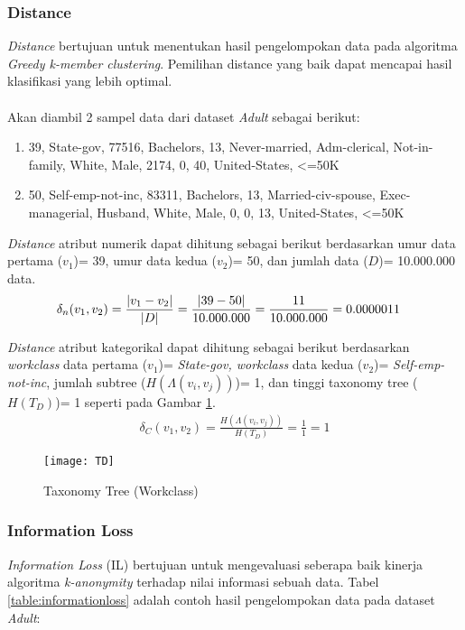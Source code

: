 \subsubsection{Distance}
\textit{Distance} bertujuan untuk menentukan hasil pengelompokan data pada algoritma \textit{Greedy k-member clustering}. Pemilihan distance yang baik dapat mencapai hasil klasifikasi yang lebih optimal.
\\\\
\noindent Akan diambil 2 sampel data dari dataset \textit{Adult} sebagai berikut:
\begin{enumerate}
\item 39, State-gov, 77516, Bachelors, 13, Never-married, Adm-clerical, Not-in-family, White, Male, 2174, 0, 40, United-States, <=50K
\item 50, Self-emp-not-inc, 83311, Bachelors, 13, Married-civ-spouse, Exec-managerial, Husband, White, Male, 0, 0, 13, United-States, <=50K
\end{enumerate}

\noindent \textit{Distance} atribut numerik dapat dihitung sebagai berikut berdasarkan umur data pertama ($v_1$)= 39, umur data kedua ($v_2$)= 50, dan jumlah data ($D$)= 10.000.000 data.
\begin{align*}
\delta_n(v_1,v_2) &= \frac{|v_1 - v_2|}{|D|}
= \frac{|39 - 50|}{10.000.000}\vspace{0.2cm}
= \frac{11}{10.000.000}\vspace{0.2cm}
= 0.0000011
\end{align*}

\noindent \textit{Distance} atribut kategorikal dapat dihitung sebagai berikut berdasarkan \textit{workclass} data pertama ($v_1$)= \textit{State-gov, workclass} data kedua ($v_2$)= \textit{Self-emp-not-inc}, jumlah subtree ($H(\Lambda(v_i,v_j))$)= 1, dan tinggi taxonomy tree ($H(T_D)$)= 1  seperti pada Gambar \ref{fig:TD}.
\begin{align*}
\delta_C(v_1,v_2) = \frac{H(\Lambda(v_i,v_j))}{H(T_D)} 
= \frac{1}{1}
= 1
\end{align*}

\begin{figure}[H]
	\centering
	\texttt{[image: TD]}
	\caption{Taxonomy Tree (Workclass)}
	\label{fig:TD}
\end{figure}

\subsubsection{Information Loss}
\textit{Information Loss} (IL) bertujuan untuk mengevaluasi seberapa baik kinerja algoritma \textit{k-anonymity} terhadap nilai informasi sebuah data. Tabel  \ref{table:informationloss} adalah contoh hasil pengelompokan data pada dataset \textit{Adult}:

